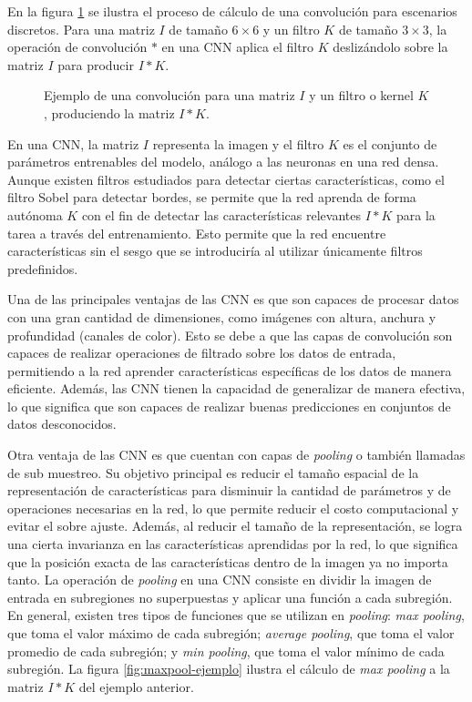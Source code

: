 En la figura \ref{fig:convolucion-ejemplo} se ilustra el proceso de cálculo de una convolución para escenarios
discretos. Para una matriz $I$ de tamaño $6\times6$ y un filtro $K$ de tamaño $3\times3$, la operación de convolución
$*$ en una CNN aplica el filtro $K$ deslizándolo sobre la matriz $I$ para producir $I*K$.

\begin{figure}[H]
  \centering
  \caption[Operador {\it convolución}]{Ejemplo de una convolución para una matriz $I$ y un filtro o kernel $K$, produciendo la matriz $I*K$.}
  \label{fig:convolucion-ejemplo}
\end{figure}

En una CNN, la matriz $I$ representa la imagen y el filtro $K$ es el conjunto de parámetros entrenables del modelo,
análogo a las neuronas en una red densa. Aunque existen filtros estudiados para detectar ciertas características, como
el filtro Sobel para detectar bordes, se permite que la red aprenda de forma autónoma $K$ con el fin de detectar las
características relevantes $I*K$ para la tarea a través del entrenamiento. Esto permite que la red encuentre
características sin el sesgo que se introduciría al utilizar únicamente filtros predefinidos.

Una de las principales ventajas de las CNN es que son capaces de procesar datos con una gran cantidad de dimensiones,
como imágenes con altura, anchura y profundidad (canales de color). Esto se debe a que las capas de convolución son
capaces de realizar operaciones de filtrado sobre los datos de entrada, permitiendo a la red aprender características
específicas de los datos de manera eficiente. Además, las CNN tienen la capacidad de generalizar de manera efectiva, lo
que significa que son capaces de realizar buenas predicciones en conjuntos de datos desconocidos.

Otra ventaja de las CNN es que cuentan con capas de {\it pooling} o también llamadas de sub muestreo. Su objetivo
principal es reducir el tamaño espacial de la representación de características para disminuir la cantidad de
parámetros y de operaciones necesarias en la red, lo que permite reducir el costo computacional y evitar el sobre
ajuste. Además, al reducir el tamaño de la representación, se logra una cierta invarianza en las características
aprendidas por la red, lo que significa que la posición exacta de las características dentro de la imagen ya no importa
tanto. La operación de {\it pooling} en una CNN consiste en dividir la imagen de entrada en subregiones no superpuestas
y aplicar una función a cada subregión. En general, existen tres tipos de funciones que se utilizan en {\it pooling}:
{\it max pooling}, que toma el valor máximo de cada subregión; {\it average pooling}, que toma el valor promedio de
cada subregión; y {\it min pooling}, que toma el valor mínimo de cada subregión. La figura \ref{fig:maxpool-ejemplo}
ilustra el cálculo de {\it max pooling} a la matriz $I*K$ del ejemplo anterior.

